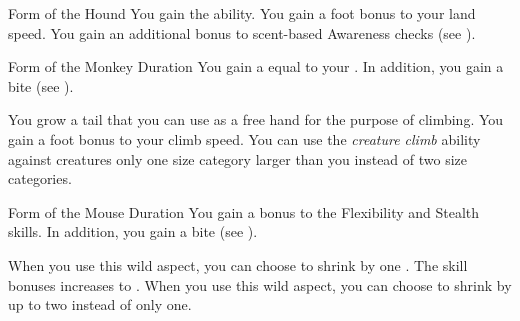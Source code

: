 {\begin{durationability}{Form of the Hound}
                \rankline
                 You gain the  ability.
                 You gain a  foot bonus to your land speed.
                 You gain an additional  bonus to scent-based Awareness checks (see ).
            \end{durationability}

            \begin{durationability}{Form of the Monkey}
                Duration
                \rankline
                You gain a  equal to your .
                In addition, you gain a bite  (see ).

                \rankline
                 You grow a tail that you can use as a free hand for the purpose of climbing.
                 You gain a  foot bonus to your climb speed.
                 You can use the \textit{creature climb} ability against creatures only one size category larger than you instead of two size categories.
            \end{durationability}

            \begin{durationability}{Form of the Mouse}
                Duration
                \rankline
                You gain a  bonus to the Flexibility and Stealth skills.
                In addition, you gain a bite  (see ).
                
                \rankline
                 When you use this wild aspect, you can choose to shrink by one .
                 The skill bonuses increases to .
                 When you use this wild aspect, you can choose to shrink by up to two  instead of only one.
            \end{durationability}


}
